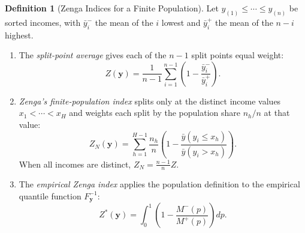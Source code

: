 \documentclass[12pt]{article}
\theoremstyle{plain}
\theoremstyle{definition}
\newtheorem{definition}[theorem]{Definition}
\theoremstyle{remark}
\newcommand{\bfy}{\mathbf{y}}
\begin{document}
\begin{definition}[Zenga Indices for a Finite Population]\label{def:integral_zenga}
Let $y_{(1)} \leq \cdots \leq y_{(n)}$ be sorted incomes, with $\bar{y}^{-}_i$ the mean of the $i$ lowest and $\bar{y}^{+}_i$ the mean of the $n - i$ highest.
\begin{enumerate}[label=(\alph*)]
    \item The \emph{split-point average} gives each of the $n-1$ split points equal weight:
    \begin{equation}\label{eq:zenga}
    Z(\bfy) = \frac{1}{n-1}\sum_{i=1}^{n-1}\left(1 - \frac{\bar{y}^{-}_i}{\bar{y}^{+}_i}\right).
    \end{equation}
    \item \emph{Zenga's finite-population index} \citep[eq.~1]{Zenga2020} splits only at the distinct income values $x_1 < \cdots < x_H$ and weights each split by the population share $n_h/n$ at that value:
    \begin{equation}\label{eq:zenga_finite}
    Z_N(\bfy) = \sum_{h=1}^{H-1} \frac{n_h}{n}\left(1 - \frac{\bar{y}(y_i \leq x_h)}{\bar{y}(y_i > x_h)}\right).
    \end{equation}
    When all incomes are distinct, $Z_N = \frac{n-1}{n} Z$.
    \item The \emph{empirical Zenga index} applies the population definition to the empirical quantile function $F^{-1}_{\bfy}$:
    \begin{equation}\label{eq:zenga_star}
    Z^*(\bfy) = \int_0^1 \left(1 - \frac{M^{-}(p)}{M^{+}(p)}\right) dp.
    \end{equation}
\end{enumerate}
\end{definition}
\end{document}
